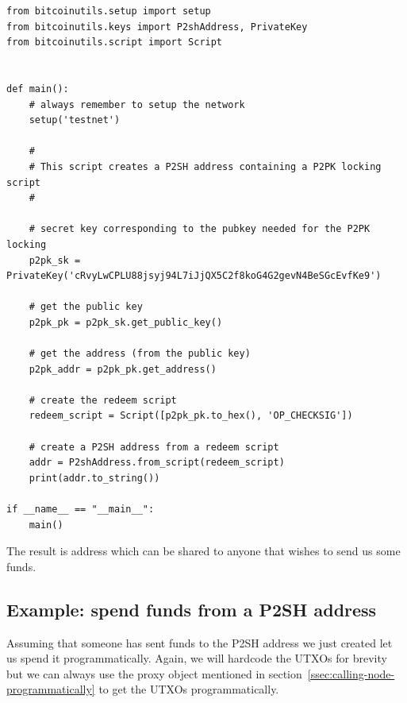 \vspace{1em}
\begin{lstlisting}[style=Python]
from bitcoinutils.setup import setup
from bitcoinutils.keys import P2shAddress, PrivateKey
from bitcoinutils.script import Script


def main():
    # always remember to setup the network
    setup('testnet')

    #
    # This script creates a P2SH address containing a P2PK locking script
    #

    # secret key corresponding to the pubkey needed for the P2PK locking
    p2pk_sk = PrivateKey('cRvyLwCPLU88jsyj94L7iJjQX5C2f8koG4G2gevN4BeSGcEvfKe9')

    # get the public key
    p2pk_pk = p2pk_sk.get_public_key()

    # get the address (from the public key)
    p2pk_addr = p2pk_pk.get_address()

    # create the redeem script
    redeem_script = Script([p2pk_pk.to_hex(), 'OP_CHECKSIG'])

    # create a P2SH address from a redeem script
    addr = P2shAddress.from_script(redeem_script)
    print(addr.to_string())

if __name__ == "__main__":
    main()
\end{lstlisting}
\vspace{1em}

The result is address  which can be shared to anyone that wishes to send us some funds.


\subsection*{Example: spend funds from a P2SH address}
Assuming that someone has sent funds to the P2SH address we just created let us spend it programmatically. Again, we will hardcode the UTXOs for brevity but we can always use the proxy object mentioned in section~\ref{ssec:calling-node-programmatically} to get the UTXOs programmatically.

